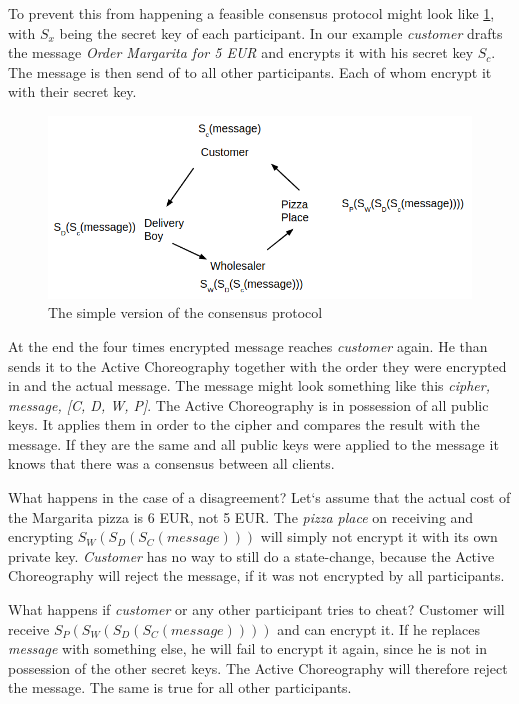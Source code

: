 \documentclass[runningheads]{llncs}
\begin{document}
To prevent this from happening a feasible consensus protocol might look like \ref{fig:simple}, with $S_x$ being the secret key of each participant. In our example \textit{customer} drafts the message \textit{Order Margarita for 5 EUR} and encrypts it with his secret key $S_c$. The message is then send of to all other participants. Each of whom encrypt it with their secret key. 


\begin{figure}
    \centering
    \includegraphics[scale=0.6]{simple_consensus.png}
    \caption{The simple version of the consensus protocol}
    \label{fig:simple}
\end{figure}


At the end the four times encrypted message reaches \textit{customer} again. He than sends it to the Active Choreography together with the order they were encrypted in and the actual message. The message might look something like this \textit{cipher, message, [C, D, W, P]}. The Active Choreography is in possession of all public keys. It applies them in order to the cipher and compares the result with the message. If they are the same and all public keys were applied to the message it knows that there was a consensus between all clients. 

What happens in the case of a disagreement? Let`s assume that the actual cost of the Margarita pizza is 6 EUR, not 5 EUR. The \textit{pizza place} on receiving and encrypting  $S_W(S_D(S_C(message)))$ will simply not encrypt it with its own private key. \textit{Customer} has no way to still do a state-change, because the Active Choreography will reject the message, if it was not encrypted by all participants. 

What happens if \textit{customer} or any other participant tries to cheat? Customer will receive $S_P(S_W(S_D(S_C(message))))$ and can encrypt it. If he replaces \textit{message} with something else, he will fail to encrypt it again, since he is not in possession of the other secret keys. The Active Choreography will therefore reject the message. The same is true for all other participants. 
\end{document}

